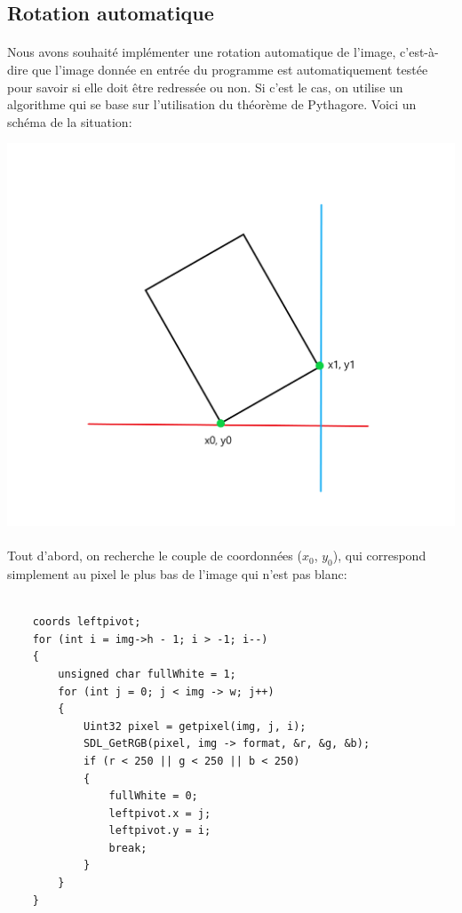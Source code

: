 \documentclass{article}
\begin{document}
\subsection{Rotation automatique}
\paragraph{}
Nous avons souhaité implémenter une rotation automatique de l'image, c'est-à-dire que l'image donnée en entrée du programme est automatiquement testée pour savoir si elle doit être redressée ou non. Si c'est le cas, on utilise un algorithme qui se base sur l'utilisation du théorème de Pythagore. Voici un schéma de la situation: \\

    \begin{center}
    	\includegraphics[scale=0.4]{Schema-rotation.png}
    \end{center}
    
\paragraph{}
Tout d'abord, on recherche le couple de coordonnées ($x_0$, $y_0$), qui correspond simplement au pixel le plus bas de l'image qui n'est pas blanc: \\


\begin{lstlisting}

    coords leftpivot;
    for (int i = img->h - 1; i > -1; i--)
    {
        unsigned char fullWhite = 1;
        for (int j = 0; j < img -> w; j++)
        {
            Uint32 pixel = getpixel(img, j, i);
            SDL_GetRGB(pixel, img -> format, &r, &g, &b);
            if (r < 250 || g < 250 || b < 250)
            {
                fullWhite = 0;
                leftpivot.x = j;
                leftpivot.y = i;
                break;
            }
        }
    }
\end{lstlisting}
\end{document}
